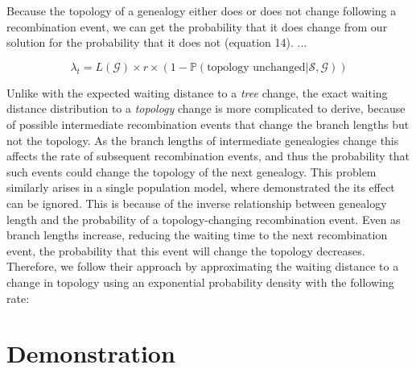 \documentclass[11pt]{article}
\begin{document}
Because the topology of a genealogy either does or does not change
following a recombination event, we can get the probability that it 
does change from our solution for the probability that it does not 
(equation 14). ...

\begin{equation}
	\lambda_{t} = 
	L(\mathcal{G}) \times r \times 
	(1 - \mathbb{P}(\text{topology unchanged} | \mathcal{S},\mathcal{G}))
\end{equation}

Unlike with the expected waiting distance to a \emph{tree} change, the exact 
waiting distance distribution to a \emph{topology} change is more 
complicated to derive, because of possible intermediate recombination events 
that change the branch lengths but not the topology. 
As the branch lengths of intermediate genealogies change this affects the
rate of subsequent recombination events, and thus 
the probability
that such events could change
the topology of the %
next
genealogy. This problem similarly arises in a single population model,
where \citet{deng_distribution_2021} 
demonstrated the its effect can be ignored. This is because of the 
inverse relationship between genealogy length
and the probability of a topology-changing recombination event. Even as branch 
lengths increase, reducing the waiting time to the next recombination event, the
probability that %
this event 
will change the topology decreases. 
Therefore, we follow their approach by approximating the waiting distance to
a change in topology using an exponential probability density 
with the following rate:


\section{Demonstration}
\end{document}
